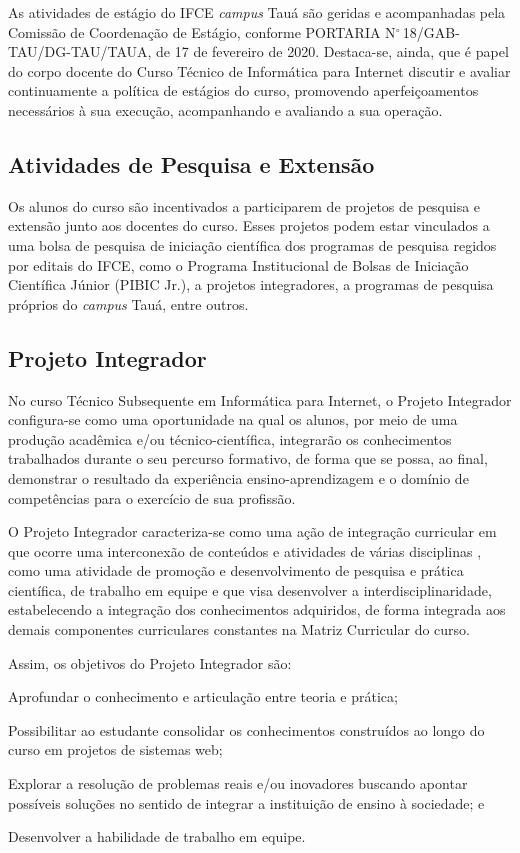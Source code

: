\documentclass[
	12pt,				%
	openright,			%
	twoside,			%
	a4paper,			%
	chapter=TITLE,		%
	english,			%
	french,				%
	spanish,			%
	brazil,				%
	]{abntex2}
\begin{document}
As atividades de estágio do IFCE \textit{campus} Tauá são geridas e acompanhadas pela Comissão de Coordenação de Estágio, conforme  PORTARIA N$^\circ$\,18/GAB-TAU/DG-TAU/TAUA, de 17 de fevereiro de 2020. Destaca-se, ainda, que é papel do corpo docente do Curso Técnico de Informática para Internet discutir e avaliar continuamente a política de estágios do curso, promovendo aperfeiçoamentos necessários à sua execução, acompanhando e avaliando a sua operação.


\subsection{Atividades de Pesquisa e Extensão}
Os alunos do curso são incentivados a participarem de projetos de pesquisa e extensão junto aos docentes do curso. Esses projetos podem estar vinculados a uma bolsa de pesquisa de iniciação científica dos programas de pesquisa regidos por editais do IFCE, como o  Programa Institucional de Bolsas de Iniciação Científica Júnior (PIBIC Jr.), a projetos integradores, a programas de pesquisa próprios do \textit{campus} Tauá, entre outros. 


\subsection{Projeto Integrador}


No curso Técnico Subsequente em Informática para Internet, o Projeto Integrador configura-se como uma oportunidade na qual os alunos, por meio de uma produção acadêmica e/ou técnico-científica, integrarão os conhecimentos trabalhados durante o seu percurso formativo, de forma que se possa, ao final, demonstrar o resultado da experiência ensino-aprendizagem e o domínio de competências para o exercício de sua profissão.

O Projeto Integrador caracteriza-se como uma ação de integração curricular em que ocorre uma interconexão de conteúdos e atividades de várias disciplinas \cite{pj}, como uma atividade de promoção e desenvolvimento de pesquisa e prática científica, de trabalho em equipe e que visa desenvolver a interdisciplinaridade, estabelecendo a integração dos conhecimentos adquiridos, de forma integrada aos demais componentes curriculares constantes na Matriz Curricular do curso.


Assim, os objetivos do Projeto Integrador são:
\begin{alineas}
\item Aprofundar o conhecimento e articulação entre teoria e prática;
\item  Possibilitar ao estudante consolidar os conhecimentos construídos ao longo
do curso em projetos de sistemas web;
\item  Explorar a resolução de problemas reais e/ou inovadores buscando apontar possíveis soluções no sentido de integrar a instituição de ensino à sociedade; e
\item Desenvolver a habilidade de trabalho em equipe.

\end{alineas}
\end{document}
